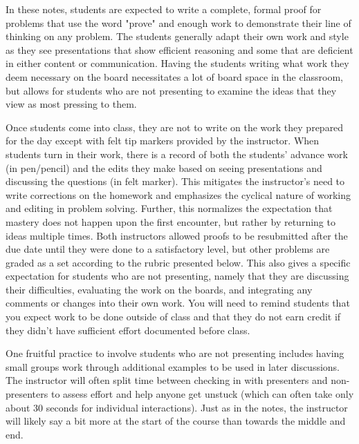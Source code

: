\begin{annotation}
In these notes, students are expected to write a complete, formal proof for problems that use the word "prove" and enough work to demonstrate their line of thinking on any problem. The students generally adapt their own work and style as they see presentations that show efficient reasoning and some that are deficient in either content or communication. Having the students writing what work they deem necessary on the board necessitates a lot of board space in the classroom, but allows for students who are not presenting to examine the ideas that they view as most pressing to them.

Once students come into class, they are not to write on the work they prepared for the day except with felt tip markers provided by the instructor. When students turn in their work, there is a record of both the students' advance work (in pen/pencil) and the edits they make based on seeing presentations and discussing the questions (in felt marker). This mitigates the instructor’s need to write corrections on the homework and emphasizes the cyclical nature of working and editing in problem solving. Further, this normalizes the expectation that mastery does not happen upon the first encounter, but rather by returning to ideas multiple times. Both instructors allowed proofs to be resubmitted after the due date until they were done to a satisfactory level, but other problems are graded as a set according to the rubric presented below. This also gives a specific expectation for students who are not presenting, namely that they are discussing their difficulties, evaluating the work on the boards, and integrating any comments or changes into their own work. You will need to remind students that you expect work to be done outside of class and that they do not earn credit if they didn't have sufficient effort documented before class.

One fruitful practice to involve students who are not presenting includes having small groups work through additional examples to be used in later discussions. The instructor will often split time between checking in with presenters and non-presenters to assess effort and help anyone get unstuck (which can often take only about 30 seconds for individual interactions). Just as in the notes, the instructor will likely say a bit more at the start of the course than towards the middle and end.


\end{annotation}

